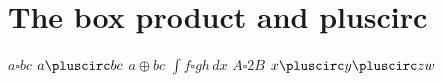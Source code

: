\documentclass{article}
\begin{document}
\section{The box product and pluscirc}
$a\square b c$ $a\pluscirc b c$ $a\oplus b c$ $\int f\square g h\,dx$ $A\square 2B$ $x\pluscirc y\pluscirc z w$
\end{document}
